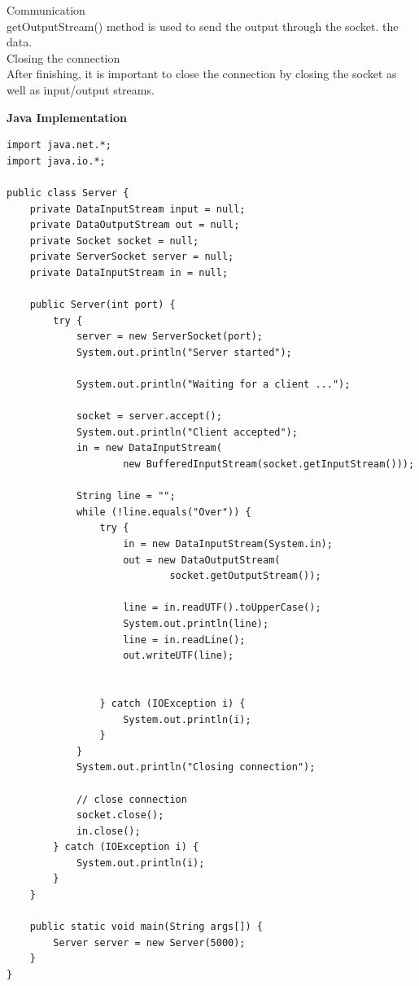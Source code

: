 \documentclass[11pt]{article}
\begin{document}
Communication\\[6pt] 
getOutputStream() method is used to send the output through the socket. the data. \\[2pt]

Closing the connection\\[6pt]

After finishing,  it is important to close the connection by closing the socket as well as input/output streams.\\[12pt]

\pagebreak

\textbf{Java Implementation}\\[12pt]

\begin{verbatim}
import java.net.*;
import java.io.*;

public class Server {
    private DataInputStream input = null;
    private DataOutputStream out = null;
    private Socket socket = null;
    private ServerSocket server = null;
    private DataInputStream in = null;

    public Server(int port) {
        try {
            server = new ServerSocket(port);
            System.out.println("Server started");

            System.out.println("Waiting for a client ...");

            socket = server.accept();
            System.out.println("Client accepted");
            in = new DataInputStream(
                    new BufferedInputStream(socket.getInputStream()));

            String line = "";
            while (!line.equals("Over")) {
                try {
                    in = new DataInputStream(System.in);
                    out = new DataOutputStream(
                            socket.getOutputStream());

                    line = in.readUTF().toUpperCase();
                    System.out.println(line);
                    line = in.readLine();
                    out.writeUTF(line);


                } catch (IOException i) {
                    System.out.println(i);
                }
            }
            System.out.println("Closing connection");

            // close connection
            socket.close();
            in.close();
        } catch (IOException i) {
            System.out.println(i);
        }
    }

    public static void main(String args[]) {
        Server server = new Server(5000);
    }
}
\end{verbatim}
\end{document}
